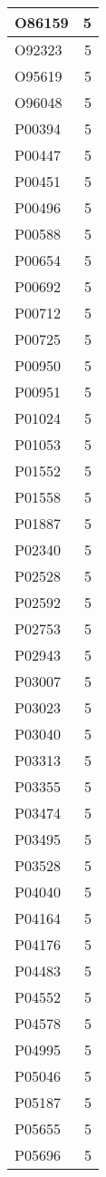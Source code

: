 \documentclass[
]{book}
\theoremstyle{definition}
\theoremstyle{definition}
\theoremstyle{definition}
\theoremstyle{definition}
\theoremstyle{remark}
\begin{document}
\begin{table}
\begin{tabular}{l|r}
\hline
O86159 & 5\\
\hline
O92323 & 5\\
\hline
O95619 & 5\\
\hline
O96048 & 5\\
\hline
P00394 & 5\\
\hline
P00447 & 5\\
\hline
P00451 & 5\\
\hline
P00496 & 5\\
\hline
P00588 & 5\\
\hline
P00654 & 5\\
\hline
P00692 & 5\\
\hline
P00712 & 5\\
\hline
P00725 & 5\\
\hline
P00950 & 5\\
\hline
P00951 & 5\\
\hline
P01024 & 5\\
\hline
P01053 & 5\\
\hline
P01552 & 5\\
\hline
P01558 & 5\\
\hline
P01887 & 5\\
\hline
P02340 & 5\\
\hline
P02528 & 5\\
\hline
P02592 & 5\\
\hline
P02753 & 5\\
\hline
P02943 & 5\\
\hline
P03007 & 5\\
\hline
P03023 & 5\\
\hline
P03040 & 5\\
\hline
P03313 & 5\\
\hline
P03355 & 5\\
\hline
P03474 & 5\\
\hline
P03495 & 5\\
\hline
P03528 & 5\\
\hline
P04040 & 5\\
\hline
P04164 & 5\\
\hline
P04176 & 5\\
\hline
P04483 & 5\\
\hline
P04552 & 5\\
\hline
P04578 & 5\\
\hline
P04995 & 5\\
\hline
P05046 & 5\\
\hline
P05187 & 5\\
\hline
P05655 & 5\\
\hline
P05696 & 5\\

\end{tabular}
\end{table}
\end{document}
